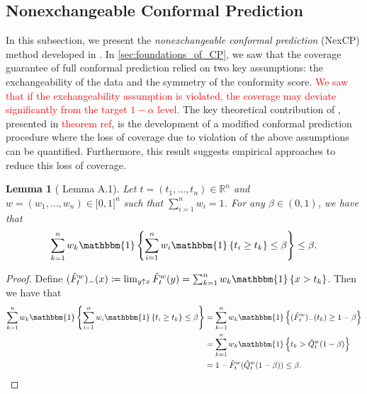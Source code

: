 \documentclass[11pt, titlepage]{article} %
\newcommand{\Ind}[1]{\mathbbm{1}\left\{ #1 \right\}}
\numberwithin{equation}{section}
\newtheorem{lemma}{Lemma}
\theoremstyle{definition}
\numberwithin{theorem}{section}
\numberwithin{lemma}{section}
\numberwithin{corollary}{section}
\numberwithin{proposition}{section}
\numberwithin{definition}{section}
\numberwithin{remark}{section}
\begin{document}
\subsection{Nonexchangeable Conformal Prediction}


In this subsection, we present the \textit{nonexchangeable conformal prediction} (NexCP) method developed in \cite{barber2023conformalbeyondexch}. In \cref{sec:foundations_of_CP}, we saw that the coverage guarantee of full conformal prediction relied on two key assumptions: the exchangeability of the data and the symmetry of the conformity score. \textcolor{red}{We saw that if the exchangeability assumption is violated, the coverage may deviate significantly from the target \(1-\alpha\) level.} The key theoretical contribution of \cite{barber2023conformalbeyondexch}, presented in \textcolor{red}{theorem ref}, is the development of a modified conformal prediction procedure where the loss of coverage due to violation of the above assumptions can be quantified. Furthermore, this result suggests empirical approaches to reduce this loss of coverage. \vskip5pt

\begin{lemma}[\cite{harrison2012} Lemma A.1]
    Let \(t = (t_1, \ldots, t_n) \in \mathbb{R}^n\) and \(w = (w_1, \ldots, w_n) \in \mathbb[0,1]^n\) such that \(\sum_{i=1}^n w_i = 1\). For any \(\beta \in (0,1)\), we have that \[\sum_{k=1}^n w_k \Ind{\sum_{i=1}^n w_i \Ind{t_i \geq t_k } \leq \beta} \leq \beta.\]
\label{lemma:harrison_2012}
\end{lemma}
\begin{proof}
    Define \((\hat{F}^w_t)_- (x) \coloneqq \lim_{y \uparrow x} \hat{F}^w_t(y) = \sum_{k=1}^n w_k \Ind{x > t_k} \). Then we have that \begin{align*}
        \sum_{k=1}^n w_k \Ind{\sum_{i=1}^n w_i \Ind{t_i \geq t_k } \leq \beta} &= \sum_{k=1}^n w_k \Ind{(\hat{F}^w_t)_-(t_k) \geq 1-\beta} \\
        &= \sum_{k=1}^n w_k \Ind{t_k > \hat{Q}^w_t(1-\beta)} \\
        &= 1 - \hat{F}^w_t(\hat{Q}^w_t(1-\beta)) \leq \beta.
    \end{align*}
\end{proof}
\end{document}
